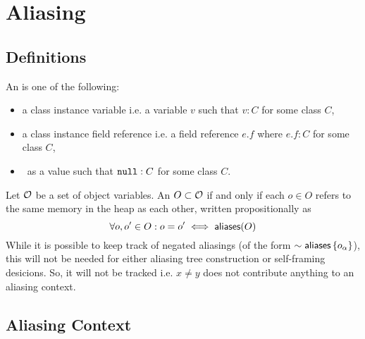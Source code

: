 \section{Aliasing}

\subsection{Definitions}

An  is one of the following:
\begin{itemize}
  \item a class instance variable i.e. a variable $v$ such that $v : C$ for some class $C$,
  \item a class instance field reference i.e. a field reference $e.f$ where $e.f : C$ for some class $C$,
  \item \cnull \ as a value such that $\texttt{null} : C$ for some class $C$.
\end{itemize}
Let $\mathcal{O}$ be a set of object variables.
An $O \subset \mathcal{O}$  if and only if
each $o \in O$ refers to the same memory in the heap as each other,
written propositionally as
$$
  \forall o, o^\prime \in O : o = o^\prime \iff \textsf{aliases}(O)
$$
While it is possible to keep track of negated aliasings (of the form  $\sim \textsf{aliases}\left\{  o_\alpha  \right\}$), this will not be needed for either aliasing tree construction or self-framing desicions. So, it will not be tracked i.e. $x \neq y$ does not contribute anything to an aliasing context.

\subsection{Aliasing Context}

